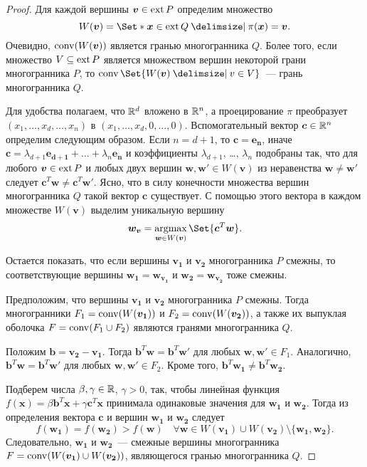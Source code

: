 \begin{proof}
Для каждой вершины $\bm{v} \in \operatorname{ext} P$ определим множество
\[
W(\bm{v}) = \Set*{\bm{x} \in \ext Q \given \pi(\bm{x}) = \bm{v}}.
\]
Очевидно, $\operatorname{conv} (W(\bm{v}))$ является гранью многогранника $Q$.
Более того, если множество $V \subseteq \operatorname{ext} P$ является множеством вершин некоторой грани многогранника $P$, то $\conv \Set{W(\bm{v})\given v\in V}$~--- грань многогранника $Q$.

Для удобства полагаем, что $\mathbb{R}^d$ вложено в $\mathbb{R}^n$,
а проецирование $\pi$ преобразует $(x_1, \dots, x_d, \dots, x_n)$ в $(x_1, \dots, x_d, 0, \dots, 0)$.
Вспомогательный вектор $\bm{c} \in \mathbb{R}^n$ определим следующим образом.
Если $n = d+1$, то $\bm{c} = \bm{e_n}$,
иначе $\bm{c} = \lambda_{d+1} \bm{e_{d+1}} + \dots + \lambda_{n} \bm{e_n}$
и коэффициенты $\lambda_{d+1}$, \dots, $\lambda_{n}$ подобраны так, 
что для любого $\bm{v} \in \operatorname{ext} P$ и любых двух вершин $\bm{w}, \bm{w'} \in W(\bm{v})$ из неравенства $\bm{w} \ne \bm{w'}$ следует $\bm{c}^T \bm{w} \ne \bm{c}^T \bm{w'}$.
Ясно, что в силу конечности множества вершин многогранника $Q$ такой вектор $\bm{c}$ существует. 
С помощью этого вектора в каждом множестве $W(\bm{v})$ выделим уникальную вершину
\[
\bm{w_v} = \argmax_{\bm{w} \in W(\bm{v})} \Set{\bm{c}^T \bm{w}}.
\]

Остается показать, что если вершины $\bm{v_1}$ и $\bm{v_2}$ многогранника $P$ смежны, то соответствующие вершины 
$\bm{w_1} = \bm{w_{v_1}}$ и $\bm{w_2} = \bm{w_{v_2}}$ тоже смежны.

Предположим, что вершины $\bm{v_1}$ и $\bm{v_2}$ многогранника $P$ смежны.
Тогда многогранники $F_1 = \operatorname{conv} (W(\bm{v_1}))$ и $F_2 = \operatorname{conv} (W(\bm{v_2}))$, а также их выпуклая оболочка $F = \operatorname{conv}(F_1 \cup F_2)$ являются гранями многогранника $Q$.

Положим $\bm{b} = \bm{v_2} - \bm{v_1}$.
Тогда $\bm{b}^T \bm{w} = \bm{b}^T \bm{w'}$ для любых $\bm{w}, \bm{w'} \in F_1$.
Аналогично, $\bm{b}^T \bm{w} = \bm{b}^T \bm{w'}$ для любых $\bm{w}, \bm{w'} \in F_2$.
Кроме того, $\bm{b}^T \bm{w_1} \neq \bm{b}^T \bm{w_2}$.

Подберем числа $\beta, \gamma \in \mathbb{R}$, $\gamma > 0$, так,
чтобы линейная функция $f(\bm{x}) = \beta \bm{b}^T \bm{x} + \gamma \bm{c}^T \bm{x}$ принимала одинаковые значения для $\bm{w_1}$ и $\bm{w_2}$.
Тогда из определения вектора $\bm{c}$ и вершин $\bm{w_1}$ и $\bm{w_2}$ следует
\[
f(\bm{w_1}) = f(\bm{w_2}) > f(\bm{w}) \quad
\forall
\bm{w} \in W(\bm{v_1}) \cup W(\bm{v_2}) \setminus \{\bm{w_1}, \bm{w_2}\}.
\]
Следовательно, $\bm{w_1}$ и $\bm{w_2}$~--- смежные вершины многогранника $F = \operatorname{conv}(W(\bm{v_1}) \cup W(\bm{v_2}))$, являющегося гранью многогранника $Q$.
\end{proof}

